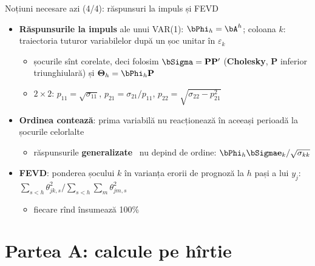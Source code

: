 \begin{frame}{Noțiuni necesare azi (4/4): răspunsuri la impuls și FEVD}
\itemsize{\small}
\begin{itemize}
    \item \textbf{Răspunsurile la impuls} ale unui VAR(1): $\bPhi_h = \bA^h$; coloana $k$: traiectoria tuturor variabilelor după un șoc unitar în $\varepsilon_k$
    \begin{itemize}
        \item șocurile sînt corelate, deci folosim $\bSigma = \mathbf{P}\mathbf{P}'$ (\textbf{Cholesky}, $\mathbf{P}$ inferior triunghiulară) și $\boldsymbol{\Theta}_h = \bPhi_h\mathbf{P}$
        \item $2 \times 2$: $p_{11} = \sqrt{\sigma_{11}}$, $p_{21} = \sigma_{21}/p_{11}$, $p_{22} = \sqrt{\sigma_{22} - p_{21}^2}$
    \end{itemize}
    \item \textbf{Ordinea contează}: prima variabilă nu reacționează în aceeași perioadă la șocurile celorlalte
    \begin{itemize}
        \item răspunsurile \textbf{generalizate} \ nu depind de ordine: $\bPhi_h\bSigma\mathbf{e}_k/\sqrt{\sigma_{kk}}$
    \end{itemize}
    \item \textbf{FEVD}: ponderea șocului $k$ în varianța erorii de prognoză la $h$ pași a lui $y_j$: $\sum_{s<h}\theta_{jk,s}^2 / \sum_{s<h}\sum_m\theta_{jm,s}^2$
    \begin{itemize}
        \item fiecare rînd însumează 100\%
    \end{itemize}
\end{itemize}
\end{frame}


\section{Partea A: calcule pe hîrtie}

